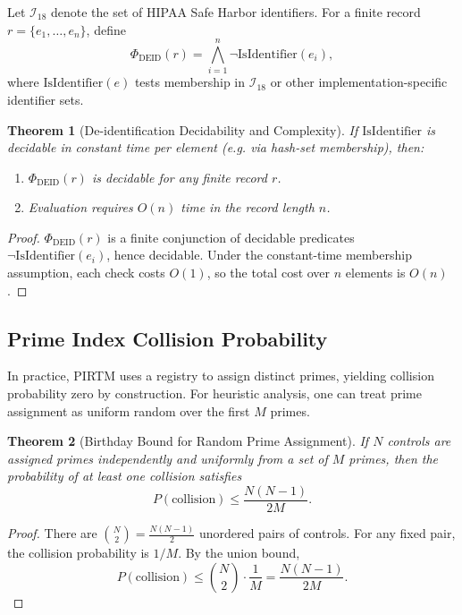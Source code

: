 \documentclass[12pt,letterpaper]{article}
\theoremstyle{definition}
\theoremstyle{plain}
\newtheorem{theorem}{Theorem}[section]
\theoremstyle{remark}
\begin{document}
Let \(\mathcal{I}_{18}\) denote the set of HIPAA Safe Harbor identifiers. For a finite record \(r = \{e_1,\dots, e_n\}\), define
\[
\Phi_{\mathrm{DEID}}(r) = \bigwedge_{i=1}^n \neg \mathrm{IsIdentifier}(e_i),
\]
where \(\mathrm{IsIdentifier}(e)\) tests membership in \(\mathcal{I}_{18}\) or other implementation-specific identifier sets.

\begin{theorem}[De-identification Decidability and Complexity]
If \(\mathrm{IsIdentifier}\) is decidable in constant time per element (e.g. via hash-set membership), then:
\begin{enumerate}
  \item \(\Phi_{\mathrm{DEID}}(r)\) is decidable for any finite record \(r\).
  \item Evaluation requires \(O(n)\) time in the record length \(n\).
\end{enumerate}
\end{theorem}

\begin{proof}
\(\Phi_{\mathrm{DEID}}(r)\) is a finite conjunction of decidable predicates \(\neg\mathrm{IsIdentifier}(e_i)\), hence decidable. Under the constant-time membership assumption, each check costs \(O(1)\), so the total cost over \(n\) elements is \(O(n)\).
\end{proof}

\subsection{Prime Index Collision Probability}
\label{subsec:prime-collision}

In practice, PIRTM uses a registry to assign distinct primes, yielding collision probability zero by construction. For heuristic analysis, one can treat prime assignment as uniform random over the first \(M\) primes.

\begin{theorem}[Birthday Bound for Random Prime Assignment]
If \(N\) controls are assigned primes independently and uniformly from a set of \(M\) primes, then the probability of at least one collision satisfies
\[
P(\text{collision}) \le \frac{N(N-1)}{2M}.
\]
\end{theorem}

\begin{proof}
There are \(\binom{N}{2} = \frac{N(N-1)}{2}\) unordered pairs of controls. For any fixed pair, the collision probability is \(1/M\). By the union bound,
\[
P(\text{collision}) \le \binom{N}{2} \cdot \frac{1}{M} = \frac{N(N-1)}{2M}.
\]
\end{proof}
\end{document}
